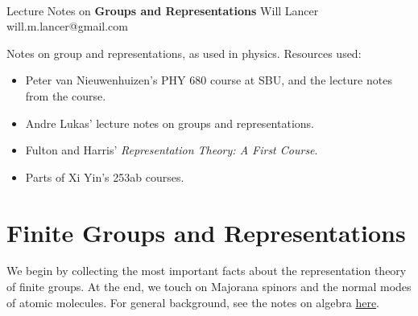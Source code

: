 \documentclass[11pt]{article}
\begin{document}
\thispagestyle{empty}
\bigskip \
\vspace{0.1cm}

\begin{center}
{\fontsize{22}{22} \selectfont Lecture Notes on}
\vskip 16pt
{\fontsize{36}{36} \selectfont \bf \sffamily Groups and Representations}
\vskip 24pt
{\fontsize{18}{18} \selectfont \rmfamily Will Lancer} 
\vskip 6pt
{\fontsize{14}{14} \selectfont \ttfamily will.m.lancer@gmail.com} 
\vskip 24pt
\end{center}

{\parindent0pt \baselineskip=15.5pt}
\noin
Notes on group and representations, as used in physics. Resources used:
\begin{itemize}
    \item Peter van Nieuwenhuizen's PHY 680 course at SBU,
    and the lecture notes from the course.
    \item Andre Lukas' lecture notes on groups and representations.
    \item Fulton and Harris' \emph{Representation Theory: A First Course}.
    \item Parts of Xi Yin's 253ab courses.
\end{itemize}
\newpage
\microtoc
\newpage


\section{Finite Groups and Representations}

We begin by collecting the most important facts about the representation
theory of finite groups. At the end, we touch on Majorana spinors and the normal
modes of atomic molecules. For general background, see the notes on
algebra \href{https://github.com/will-lancer/notes/tree/main/Mathematics/Algebra}{here}.
\end{document}
